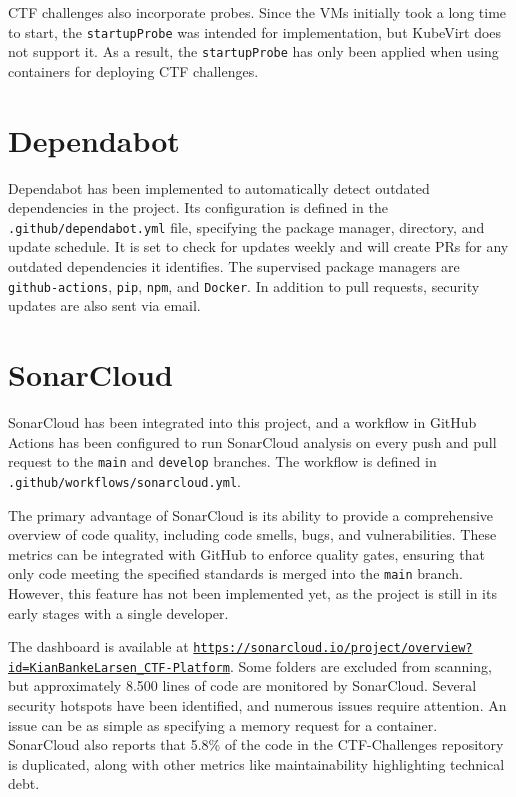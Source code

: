 CTF challenges also incorporate probes. Since the VMs initially took a long time to start, the \texttt{startupProbe} was intended for implementation, but KubeVirt does not support it. As a result, the \texttt{startupProbe} has only been applied when using containers for deploying CTF challenges.

\section{Dependabot}
Dependabot has been implemented to automatically detect outdated dependencies in the project. Its configuration is defined in the \texttt{.github/dependabot.yml} file, specifying the package manager, directory, and update schedule. It is set to check for updates weekly and will create PRs for any outdated dependencies it identifies. The supervised package managers are \texttt{github-actions}, \texttt{pip}, \texttt{npm}, and \texttt{Docker}. In addition to pull requests, security updates are also sent via email.

\section{SonarCloud}
SonarCloud has been integrated into this project, and a workflow in GitHub Actions has been configured to run SonarCloud analysis on every push and pull request to the \texttt{main} and \texttt{develop} branches. The workflow is defined in \texttt{.github/workflows/sonarcloud.yml}. 

The primary advantage of SonarCloud is its ability to provide a comprehensive overview of code quality, including code smells, bugs, and vulnerabilities. These metrics can be integrated with GitHub to enforce quality gates, ensuring that only code meeting the specified standards is merged into the \texttt{main} branch. However, this feature has not been implemented yet, as the project is still in its early stages with a single developer.

The dashboard is available at \href{https://sonarcloud.io/project/overview?id=KianBankeLarsen_CTF-Platform}{\texttt{https://sonarcloud.io/project/overview?\allowbreak id=KianBankeLarsen\_CTF-Platform}}. Some folders are excluded from scanning, but approximately 8.500 lines of code are monitored by SonarCloud. Several security hotspots have been identified, and numerous issues require attention. An issue can be as simple as specifying a memory request for a container. SonarCloud also reports that 5.8\% of the code in the CTF-Challenges repository is duplicated, along with other metrics like maintainability highlighting technical debt.

